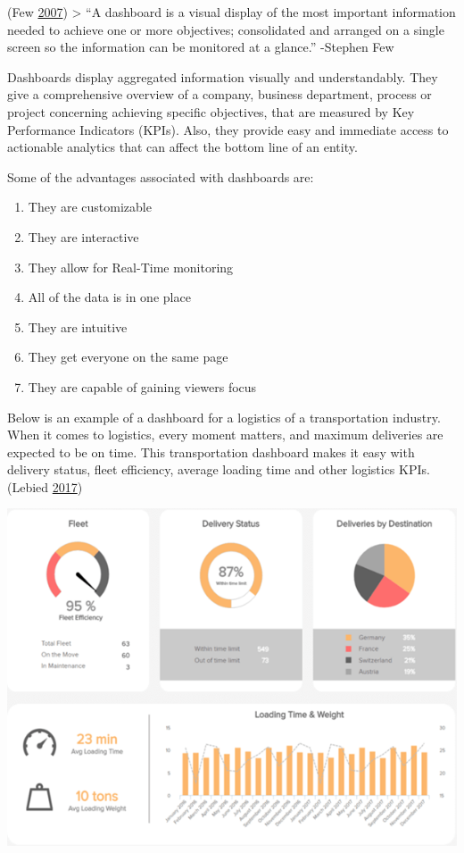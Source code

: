\documentclass[]{book}
\providecommand{\tightlist}{%
  \setlength{\itemsep}{0pt}\setlength{\parskip}{0pt}}
\begin{document}
(Few \protect\hyperlink{ref-dashboard}{2007})
\textgreater{} ``A dashboard is a visual display of the most important information needed to achieve one or more objectives; consolidated and arranged on a single screen so the information can be monitored at a glance.'' -Stephen Few

Dashboards display aggregated information visually and understandably. They give a comprehensive overview of a company, business department, process or project concerning achieving specific objectives, that are measured by Key Performance Indicators (KPIs). Also, they provide easy and immediate access to actionable analytics that can affect the bottom line of an entity.

Some of the advantages associated with dashboards are:

\begin{enumerate}
\def\labelenumi{\arabic{enumi}.}
\tightlist
\item
  They are customizable
\item
  They are interactive
\item
  They allow for Real-Time monitoring
\item
  All of the data is in one place
\item
  They are intuitive
\item
  They get everyone on the same page
\item
  They are capable of gaining viewers focus
\end{enumerate}

Below is an example of a dashboard for a logistics of a transportation industry. When it comes to logistics, every moment matters, and maximum deliveries are expected to be on time.
This transportation dashboard makes it easy with delivery status, fleet efficiency, average loading time and other logistics KPIs. (Lebied \protect\hyperlink{ref-Dashboards}{2017})

\includegraphics{images/Dashboard_ex.png}
\end{document}
